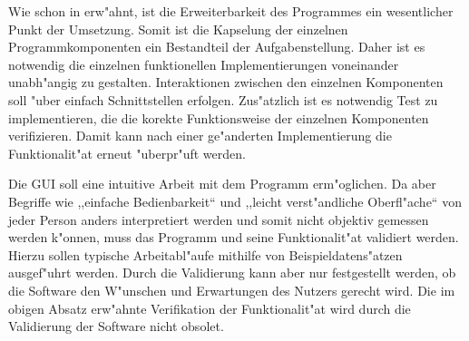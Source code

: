 Wie schon in  erw"ahnt, ist die Erweiterbarkeit des Programmes ein wesentlicher Punkt der Umsetzung.
Somit ist die Kapselung der einzelnen Programmkomponenten ein Bestandteil der Aufgabenstellung.
Daher ist es notwendig die einzelnen funktionellen Implementierungen voneinander unabh"angig zu gestalten.
Interaktionen zwischen den einzelnen Komponenten soll "uber einfach Schnittstellen erfolgen.
Zus"atzlich ist es notwendig Test zu implementieren, die die korekte Funktionsweise der einzelnen Komponenten verifizieren.
Damit kann nach einer ge"anderten Implementierung die Funktionalit"at erneut "uberpr"uft werden.

Die \ac{GUI} soll eine intuitive Arbeit mit dem Programm erm"oglichen.
Da aber Begriffe wie ,,einfache Bedienbarkeit`` und ,,leicht verst"andliche Oberfl"ache`` von jeder Person anders interpretiert werden und somit nicht objektiv gemessen werden k"onnen, muss das Programm und seine Funktionalit"at validiert werden.
Hierzu sollen typische Arbeitabl"aufe mithilfe von Beispieldatens"atzen ausgef"uhrt werden.
Durch die Validierung kann aber nur festgestellt werden, ob die Software den W"unschen und Erwartungen des Nutzers gerecht wird.
Die im obigen Absatz erw"ahnte Verifikation der Funktionalit"at wird durch die Validierung der Software nicht obsolet.

